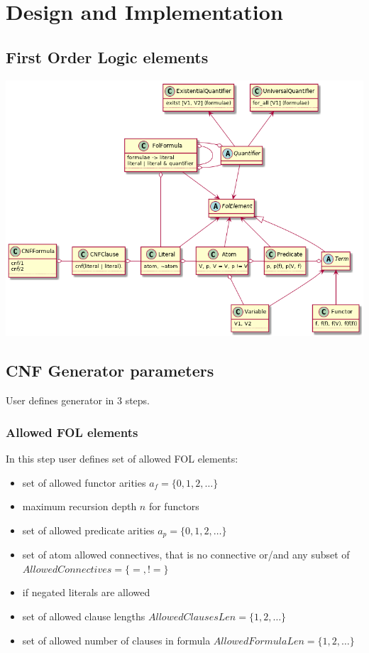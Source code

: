 \chapter{Design and Implementation}

\section{First Order Logic elements}

\begin{centering}
\includegraphics[width=\textwidth]{logic-formula-generator/fol/fol_elements.png}
\end{centering}

\section{CNF Generator parameters}

User defines generator in 3 steps.

\subsection{Allowed FOL elements}

In this step user defines set of allowed \gls{FOL} elements:
\begin{itemize}
	\item set of allowed functor arities $a_f = \{0, 1, 2,\dots\}$
	\item maximum recursion depth $n$ for functors
	\item set of allowed predicate arities $a_p = \{0, 1, 2,\dots\}$
	\item set of atom allowed connectives, that is no connective or/and any subset of $AllowedConnectives = \{=, !=\}$
	\item if negated literals are allowed
	\item set of allowed clause lengths $AllowedClausesLen = \{1,2,\dots\}$
	\item set of allowed number of clauses in formula $AllowedFormulaLen = \{1,2,\dots\}$
\end{itemize}

